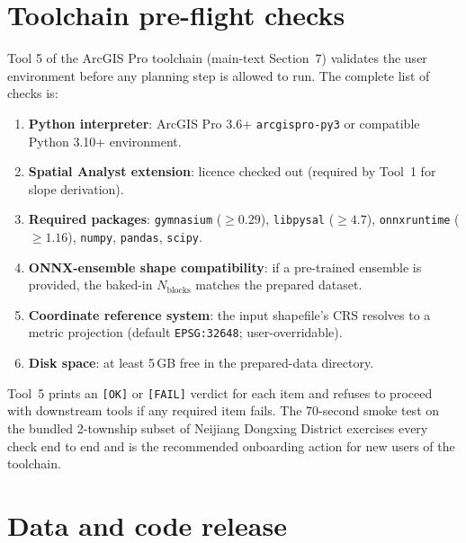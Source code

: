 \documentclass[11pt]{article}
\begin{document}


\section{Toolchain pre-flight checks}\label{si:s4-toolchain}

Tool 5 of the ArcGIS Pro toolchain (main-text Section~7) validates the user environment before any planning step is allowed to run. The complete list of checks is:

\begin{enumerate}
\item \textbf{Python interpreter}: ArcGIS Pro 3.6+ \texttt{arcgispro-py3} or compatible Python 3.10+ environment.
\item \textbf{Spatial Analyst extension}: licence checked out (required by Tool~1 for slope derivation).
\item \textbf{Required packages}: \texttt{gymnasium} ($\geq 0.29$), \texttt{libpysal} ($\geq 4.7$), \texttt{onnxruntime} ($\geq 1.16$), \texttt{numpy}, \texttt{pandas}, \texttt{scipy}.
\item \textbf{ONNX-ensemble shape compatibility}: if a pre-trained ensemble is provided, the baked-in $N_{\text{blocks}}$ matches the prepared dataset.
\item \textbf{Coordinate reference system}: the input shapefile's CRS resolves to a metric projection (default \texttt{EPSG:32648}; user-overridable).
\item \textbf{Disk space}: at least 5\,GB free in the prepared-data directory.
\end{enumerate}

Tool~5 prints an \texttt{[OK]} or \texttt{[FAIL]} verdict for each item and refuses to proceed with downstream tools if any required item fails. The 70-second smoke test on the bundled 2-township subset of Neijiang Dongxing District exercises every check end to end and is the recommended onboarding action for new users of the toolchain.

\section{Data and code release}\label{si:s5-release}
\end{document}
